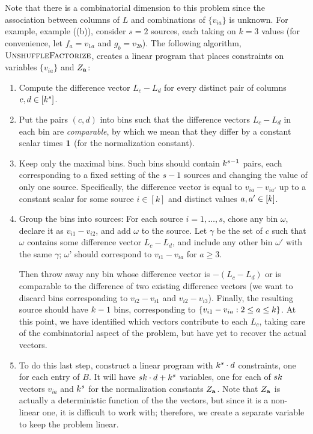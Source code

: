 Note that there is a combinatorial dimension to this problem since the association between
columns of $L$ and combinations of $\{ v_{ia} \}$ is unknown.
For example, example ((b)),
consider $s=2$ sources, each taking on $k=3$ values
(for convenience, let $f_a = v_{1a}$ and $g_b = v_{2b}$).
The following algorithm, $\text{\sc UnshuffleFactorize}$,
creates a linear program that places constraints on
variables $\{v_{ia}\}$ and $Z_{\mathbf{a}}$:
\begin{enumerate}

\item Compute the difference vector $L_c - L_d$ for every distinct pair of
columns $c,d \in [k^s]$.

\item Put the pairs $(c,d)$ into bins such that the difference vectors $L_c-L_d$
in each bin are \emph{comparable}, by which we mean that they
differ by a constant scalar times $\mathbf{1}$ (for the normalization constant).

\item Keep only the maximal bins.
Such bins should contain $k^{s-1}$ pairs, each corresponding to a fixed
setting of the $s-1$ sources
and changing the value of only one source.
Specifically, the difference vector is equal to $v_{ia} - v_{ia'}$ up to a
constant scalar for some source $i \in [k]$ and distinct values $a, a' \in
[k]$.

\item Group the bins into sources:
  For each source $i = 1, \dots, s$,
  chose any bin $\omega$, declare it as $v_{i1} - v_{i2}$,
  and add $\omega$ to the source.
  Let $\gamma$ be the set of $c$ such that $\omega$
  contains some difference vector $L_c - L_d$,
  and include any other bin $\omega'$ with the same $\gamma$;
  $\omega$' should correspond to $v_{i1} - v_{ia}$ for $a \ge 3$.

  Then throw away any bin whose difference vector is $-(L_c - L_d)$
  or is comparable to the difference of two existing difference vectors
  (we want to discard bins corresponding to $v_{i2} - v_{i1}$ and $v_{i2} - v_{i3}$).
  Finally, the resulting source should have $k-1$ bins, corresponding to $\{ v_{i1} - v_{ia} : 2 \le a \le k \}$.
  At this point, we have identified which vectors contribute to each $L_c$,
  taking care of the combinatorial aspect of the problem,
  but have yet to recover the actual vectors.

  \item To do this last step, construct a linear program with $k^s \cdot d$ constraints, one for each entry of $B$.
  It will have $sk \cdot d + k^s$ variables,
  one for each of $sk$ vectors $v_{ia}$ and $k^s$ for the normalization constants $Z_{\mathbf{a}}$.
  Note that $Z_{\mathbf{a}}$ is actually a deterministic function of the the vectors, but since it is a non-linear one,
  it is difficult to work with; therefore, we create a separate variable to keep the problem linear.

\end{enumerate}


